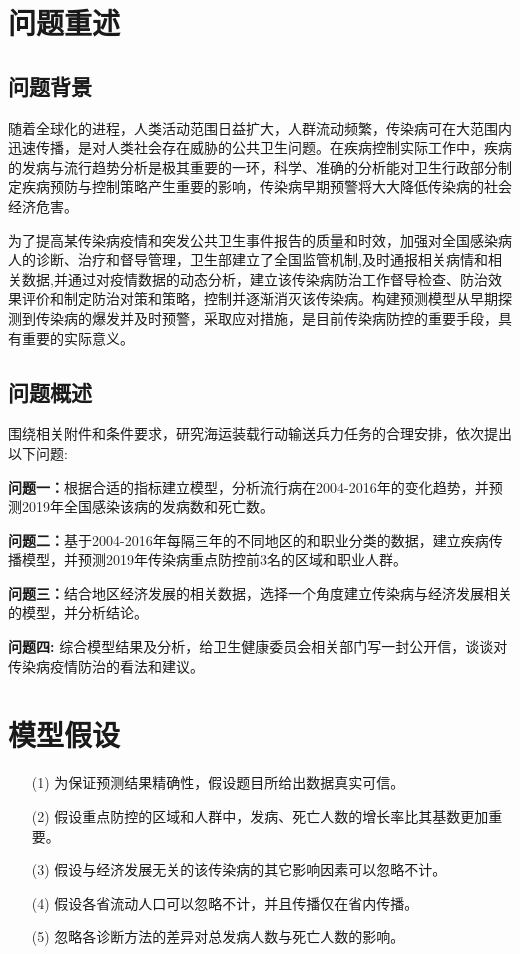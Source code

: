 \documentclass{whutmod}
\begin{document}
	\section{问题重述}	
	\subsection{问题背景}
    随着全球化的进程，人类活动范围日益扩大，人群流动频繁，传染病可在大范围内迅速传播，是对人类社会存在威胁的公共卫生问题。在疾病控制实际工作中，疾病的发病与流行趋势分析是极其重要的一环，科学、准确的分析能对卫生行政部分制定疾病预防与控制策略产生重要的影响，传染病早期预警将大大降低传染病的社会经济危害。
    
    为了提高某传染病疫情和突发公共卫生事件报告的质量和时效，加强对全国感染病人的诊断、治疗和督导管理，卫生部建立了全国监管机制,及时通报相关病情和相关数据,并通过对疫情数据的动态分析，建立该传染病防治工作督导检查、防治效果评价和制定防治对策和策略，控制并逐渐消灭该传染病。构建预测模型从早期探测到传染病的爆发并及时预警，采取应对措施，是目前传染病防控的重要手段，具有重要的实际意义。
    
    

	\subsection{问题概述}
    围绕相关附件和条件要求，研究海运装载行动输送兵力任务的合理安排，依次提出以下问题:
		 
	
	\textbf{问题一：}根据合适的指标建立模型，分析流行病在2004-2016年的变化趋势，并预测2019年全国感染该病的发病数和死亡数。
	
	\textbf{问题二：}基于2004-2016年每隔三年的不同地区的和职业分类的数据，建立疾病传播模型，并预测2019年传染病重点防控前3名的区域和职业人群。
		
	\textbf{问题三：}结合地区经济发展的相关数据，选择一个角度建立传染病与经济发展相关的模型，并分析结论。
	
	\textbf{问题四: }综合模型结果及分析，给卫生健康委员会相关部门写一封公开信，谈谈对传染病疫情防治的看法和建议。
	
	
	\section{模型假设}
	\begin{itemize}                                             
		\item [(1)] 为保证预测结果精确性，假设题目所给出数据真实可信。
		\item [(2)] 假设重点防控的区域和人群中，发病、死亡人数的增长率比其基数更加重要。
		\item [(3)] 假设与经济发展无关的该传染病的其它影响因素可以忽略不计。
		\item [(4)] 假设各省流动人口可以忽略不计，并且传播仅在省内传播。
		\item [(5)] 忽略各诊断方法的差异对总发病人数与死亡人数的影响。
	\end{itemize}		
\end{document}
